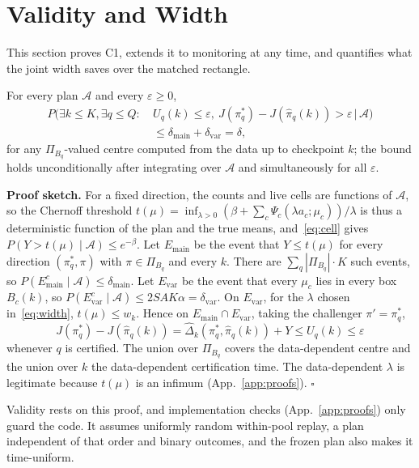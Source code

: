 \documentclass[sigconf,anonymous,review]{acmart}
\newcommand{\cA}{\mathcal{A}}
\newcommand{\eps}{\varepsilon}
\newcommand{\dmain}{\delta_{\text{main}}}
\newcommand{\dvar}{\delta_{\text{var}}}
\begin{document}
\section{Validity and Width}\label{sec:validity}

This section proves C1, extends it to monitoring at any time, and quantifies what the joint width saves over the matched rectangle.

\begin{theorem}\label{thm:fdcbet}
For every plan $\cA$ and every $\eps \ge 0$,
\[
\begin{aligned}
P\big(\exists k \le K, \exists q \le Q:\ & U_q(k) \le \eps,\ J(\pi^*_q) - J(\hat\pi_q(k)) > \eps \,\big|\, \cA\big)\\
&\le \dmain + \dvar = \delta,
\end{aligned}
\]
for any $\Pi_{B_q}$-valued centre computed from the data up to checkpoint $k$; the bound holds unconditionally after integrating over $\cA$ and simultaneously for all $\eps$.
\end{theorem}

\textbf{Proof sketch.} For a fixed direction, the counts and live cells are functions of $\cA$, so the Chernoff threshold $t(\mu) = \inf_{\lambda>0}(\beta + \sum_c \Psi_c(\lambda a_c;\mu_c))/\lambda$ is thus a deterministic function of the plan and the true means, and~\eqref{eq:cell} gives $P(Y > t(\mu) \mid \cA) \le e^{-\beta}$. Let $E_{\text{main}}$ be the event that $Y \le t(\mu)$ for every direction $(\pi^*_q, \pi)$ with $\pi \in \Pi_{B_q}$ and every $k$. There are $\sum_q|\Pi_{B_q}|\cdot K$ such events, so $P(E_{\text{main}}^c \mid \cA) \le \dmain$. Let $E_{\text{var}}$ be the event that every $\mu_c$ lies in every box $B_c(k)$, so $P(E_{\text{var}}^c \mid \cA) \le 2SAK\alpha = \dvar$. On $E_{\text{var}}$, for the $\lambda$ chosen in~\eqref{eq:width}, $t(\mu) \le w_k$. Hence on $E_{\text{main}} \cap E_{\text{var}}$, taking the challenger $\pi' = \pi^*_q$,
\[
J(\pi^*_q) - J(\hat\pi_q(k)) = \hat\Delta_k(\pi^*_q, \hat\pi_q(k)) + Y \le U_q(k) \le \eps
\]
whenever $q$ is certified. The union over $\Pi_{B_q}$ covers the data-dependent centre and the union over $k$ the data-dependent certification time. The data-dependent $\lambda$ is legitimate because $t(\mu)$ is an infimum (App.~\ref{app:proofs}). $\square$

Validity rests on this proof, and implementation checks (App.~\ref{app:proofs}) only guard the code. It assumes uniformly random within-pool replay, a plan independent of that order and binary outcomes, and the frozen plan also makes it time-uniform.
\end{document}
